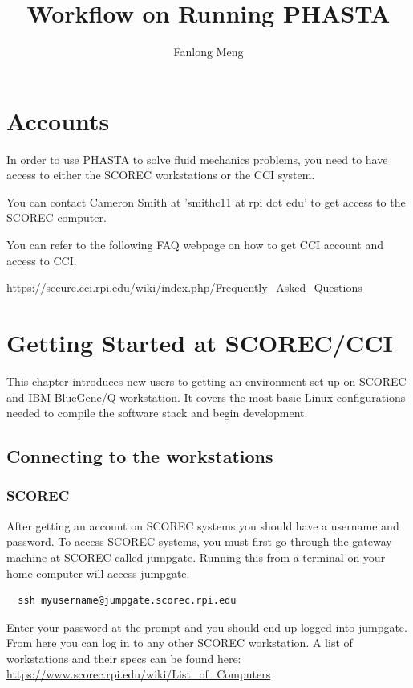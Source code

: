 \documentclass{article}
\title{Workflow on Running PHASTA}
\author{Fanlong Meng}
\begin{document}
\lstset{style=myc}

\maketitle

\section{Accounts}

In order to use PHASTA to solve fluid mechanics problems, you need to have access to either the SCOREC workstations or the CCI system.

You can contact Cameron Smith at 'smithc11 at rpi dot edu' to get access to the SCOREC computer. 

You can refer to the following FAQ webpage on how to get CCI account and access to CCI.


\url{https://secure.cci.rpi.edu/wiki/index.php/Frequently_Asked_Questions}

\section{Getting Started at SCOREC/CCI}

This chapter introduces new users to getting an environment set up on SCOREC and IBM BlueGene/Q workstation. It covers the most basic Linux configurations needed to compile the software stack and begin development.

\subsection{Connecting to the workstations}
\subsubsection{SCOREC}
After getting an account on SCOREC systems you should have a username and password. To access SCOREC systems, you must first go through the gateway machine at SCOREC called jumpgate. Running this from a terminal on your home computer will access jumpgate.
\begin{lstlisting}
  ssh myusername@jumpgate.scorec.rpi.edu
\end{lstlisting}
Enter your password at the prompt and you should end up logged into jumpgate. From here you can log in to any other SCOREC workstation. A list of workstations and their specs can be found here:\\
\url{https://www.scorec.rpi.edu/wiki/List_of_Computers}
\end{document}
